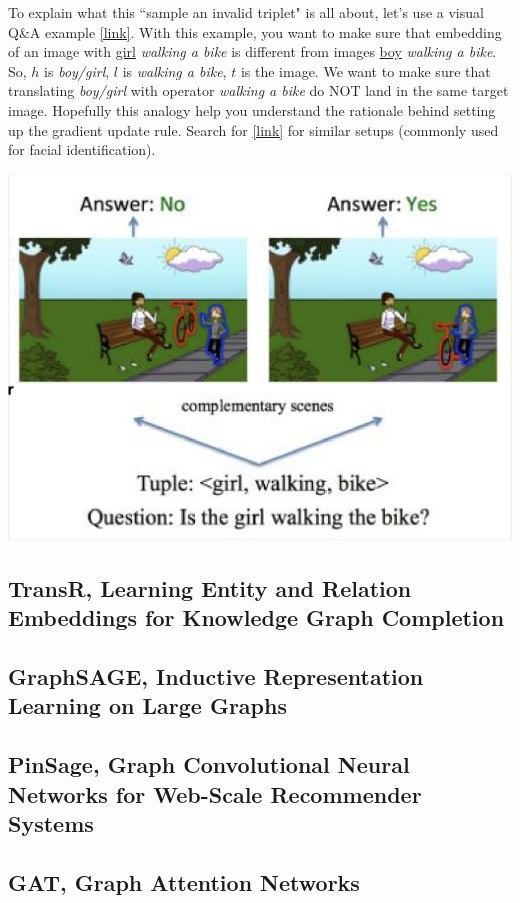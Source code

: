 To explain what this ``sample an invalid triplet" is all about, let's use a visual Q\&A example \href{https://people.cs.vt.edu/sudo777/files/siamese-network-pptx.pdf}{[link]}. With this example, you want to make sure that embedding of an image with \underline{girl} \textit{walking a bike} is different from images \underline{boy} \textit{walking a bike}. So, $h$ is \textit{boy/girl}, $l$ is \textit{walking a bike}, $t$ is the image. We want to make sure that translating \textit{boy/girl} with operator \textit{walking a bike} do NOT land in the same target image. Hopefully this analogy help you understand the rationale behind setting up the gradient update rule. Search for  \href{https://en.wikipedia.org/wiki/Siamese_neural_network}{[link]} for similar setups (commonly used for facial identification).

{
\centering
\includegraphics[width=0.6\linewidth]{notes/img/n5_siamese.png} \par
}

\subsection{TransR, Learning Entity and Relation Embeddings for Knowledge Graph Completion} \label{ss_53_transr}

\subsection{GraphSAGE, Inductive Representation Learning on Large Graphs} \label{ss_54_sage}

\subsection{PinSage, Graph Convolutional Neural Networks for Web-Scale Recommender Systems} \label{ss_55_pin_sage}

\subsection{GAT, Graph Attention Networks} \label{ss_56_gat}


